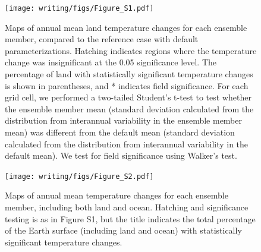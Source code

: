 \documentclass[draft, grl]{agujournal2019}
\begin{document}



\captionsetup[figure]{format=cancaption,labelformat=cancaptionlabel}
\begin{figure}[htb!]
\noindent\texttt{[image: writing/figs/Figure\_S1.pdf]}
\caption{Maps of annual mean land temperature changes for each ensemble member, compared to the reference case with default parameterizations. Hatching indicates regions where the temperature change was insignificant at the 0.05 significance level. The percentage of land with statistically significant temperature changes is shown in parentheses, and * indicates field significance. For each grid cell, we performed a two-tailed Student’s t-test to test whether the ensemble member mean (standard deviation calculated from the distribution from interannual variability in the ensemble member mean) was different from the default mean (standard deviation calculated from the distribution from interannual variability in the default mean). We test for field significance using Walker’s test.}
\label{fig:supp_coupled_Ts_land_maps}
\end{figure}

\begin{figure}[htb!]
\noindent\texttt{[image: writing/figs/Figure\_S2.pdf]}
\caption{Maps of annual mean temperature changes for each ensemble member, including both land and ocean. Hatching and significance testing is as in Figure S1, but the title indicates the total percentage of the Earth surface (including land and ocean) with statistically significant temperature changes.}
\label{fig:supp_coupled_Ts_land_and_ocean_maps}
\end{figure}
\end{document}
